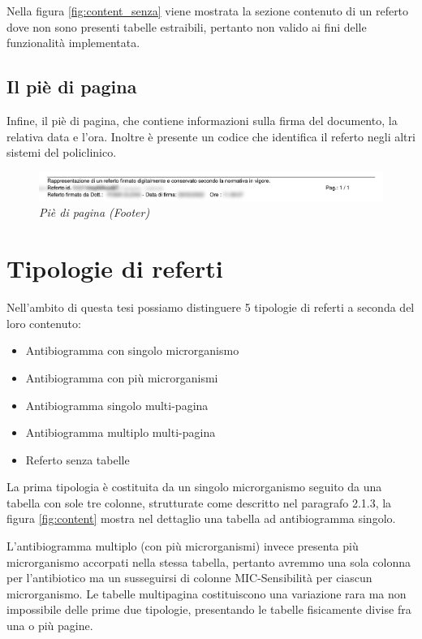 \newpage
Nella figura \ref{fig:content_senza} viene mostrata la sezione contenuto di un referto dove non sono presenti tabelle estraibili, pertanto non valido ai fini delle funzionalità implementata.

\subsection{Il piè di pagina}
Infine, il piè di pagina, che contiene informazioni sulla firma del documento, la relativa data e l'ora. Inoltre è presente un codice  che identifica il referto negli altri sistemi del policlinico.
\begin{figure}[h!]
	\centering
	\includegraphics[width=.99\columnwidth]{images/footer.png}
	\caption{\textit{Piè di pagina (Footer)}}
	\label{fig:footer}
\end{figure}
\bigskip
\newpage
\section{Tipologie di referti}
Nell'ambito di questa tesi possiamo distinguere 5 tipologie di referti a seconda del loro contenuto:
\begin{itemize}
	\item Antibiogramma con singolo microrganismo
	\item Antibiogramma con più microrganismi
	\item Antibiogramma singolo multi-pagina
	\item Antibiogramma multiplo multi-pagina
	\item Referto senza tabelle
\end{itemize}
\bigskip
La prima tipologia è costituita da un singolo microrganismo seguito da una tabella con sole tre colonne, strutturate come descritto nel paragrafo 2.1.3, la figura \ref{fig:content} mostra nel dettaglio una tabella ad antibiogramma singolo.
 
L'antibiogramma multiplo (con più microrganismi) invece presenta più microrganismo accorpati nella stessa tabella, pertanto avremmo una sola colonna per l'antibiotico ma un susseguirsi di colonne MIC-Sensibilità per ciascun microrganismo.
Le tabelle multipagina costituiscono una variazione rara ma non impossibile delle prime due tipologie, presentando le tabelle fisicamente divise fra una o più pagine.
\newpage
